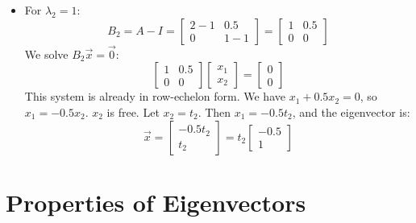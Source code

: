 \documentclass{report}
\begin{document}
{\begin{itemize}
		\item For $\lambda_2 = 1$:
		      \[B_2 = A - I = \begin{bmatrix} 2-1 & 0.5 \\ 0 & 1-1 \end{bmatrix} = \begin{bmatrix} 1 & 0.5 \\ 0 & 0 \end{bmatrix}\]
		      We solve $B_2\vec{x} = \vec{0}$:
		      \[\begin{bmatrix} 1 & 0.5 \\ 0 & 0 \end{bmatrix} \begin{bmatrix} x_1 \\ x_2 \end{bmatrix} = \begin{bmatrix} 0 \\ 0 \end{bmatrix}\]
		      This system is already in row-echelon form. We have $x_1 + 0.5x_2 = 0$, so $x_1 = -0.5x_2$.  $x_2$ is free. Let $x_2 = t_2$. Then $x_1 = -0.5t_2$, and the eigenvector is:
		      \[\vec{x} = \begin{bmatrix} -0.5t_2 \\ t_2 \end{bmatrix} = t_2 \begin{bmatrix} -0.5 \\ 1 \end{bmatrix}\]
	\end{itemize}
}

\section{Properties of Eigenvectors}

\end{document}
